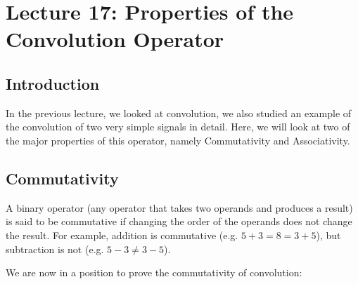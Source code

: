 \section{Lecture 17: Properties of the Convolution Operator}

\subsection{Introduction}
In the previous lecture, we looked at convolution, we also studied an example of the convolution of two very simple signals in detail. Here, we will look at two of the major properties of this operator, namely Commutativity and Associativity.

\subsection{Commutativity}

A binary operator (any operator that takes two operands and produces a result) is said to be commutative if changing the order of the operands does not change the result. For example, addition is commutative (e.g. $5+3=8=3+5$), but subtraction is not (e.g. $5-3\neq 3-5$).

\vspace{\baselineskip}
We are now in a position to prove the commutativity of convolution:

